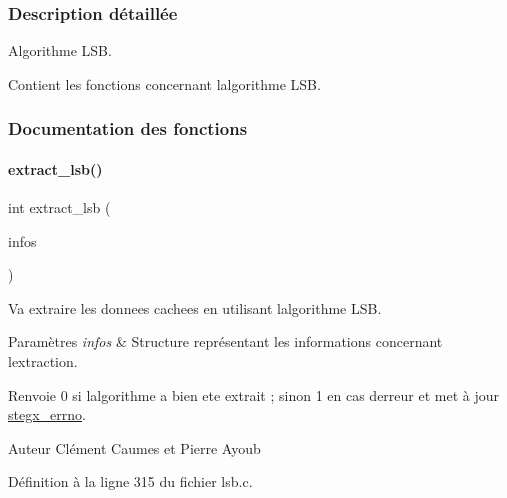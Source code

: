 \subsubsection{Description détaillée}
Algorithme L\+SB. 

Contient les fonctions concernant l\textquotesingle{}algorithme L\+SB. 

\subsubsection{Documentation des fonctions}
\mbox{\label{a00032_abc757e2627fc9971e388a584e0e0c2ca}} 
\paragraph{\texorpdfstring{extract\+\_\+lsb()}{extract\_lsb()}}
{\footnotesize\ttfamily int extract\+\_\+lsb (\begin{DoxyParamCaption}\item[{\hyperlink{a00008_aa8ca908d92fb5bdd3c0a9e1f58b2cf03}{info\+\_\+s} $\ast$}]{infos }\end{DoxyParamCaption})}



Va extraire les donnees cachees en utilisant l\textquotesingle{}algorithme L\+SB. 


\begin{DoxyParams}{Paramètres}
{\em infos} & Structure représentant les informations concernant l\textquotesingle{}extraction. \\
\hline
\end{DoxyParams}
\begin{DoxyReturn}{Renvoie}
0 si l\textquotesingle{}algorithme a bien ete extrait ; sinon 1 en cas d\textquotesingle{}erreur et met à jour \hyperlink{a00062_a5ec48ccdfbe19fe23855818f8556abec}{stegx\+\_\+errno}. 
\end{DoxyReturn}
\begin{DoxyAuthor}{Auteur}
Clément Caumes et Pierre Ayoub 
\end{DoxyAuthor}


Définition à la ligne 315 du fichier lsb.\+c.

